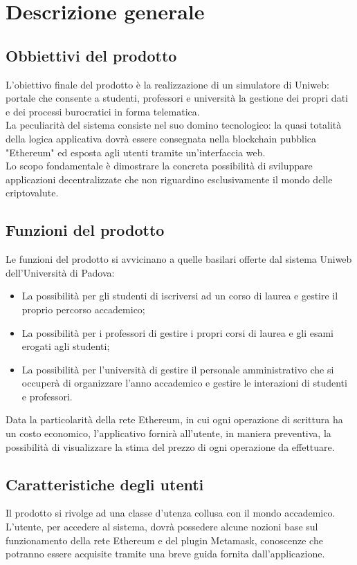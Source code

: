 \documentclass[AnalisiDeiRequisiti.tex]{subfiles}
\begin{document}
\chapter{Descrizione generale}
\section{Obbiettivi del prodotto}
L'obiettivo finale del prodotto è la realizzazione di un simulatore di Uniweb: portale che consente a studenti, professori e università la gestione dei propri dati e dei processi burocratici in forma telematica. \\
La peculiarità del sistema consiste nel suo domino tecnologico: la quasi totalità della logica applicativa dovrà essere consegnata nella blockchain pubblica "Ethereum" ed esposta agli utenti tramite un'interfaccia web. \\
Lo scopo fondamentale è dimostrare la concreta possibilità di sviluppare applicazioni decentralizzate che non riguardino esclusivamente il mondo delle criptovalute.

\section{Funzioni del prodotto}
Le funzioni del prodotto si avvicinano a quelle basilari offerte dal sistema Uniweb dell'Università di Padova:
\begin{itemize}
	\item La possibilità per gli studenti di iscriversi ad un corso di laurea e gestire il proprio percorso accademico;
	\item La possibilità per i professori di gestire i propri corsi di laurea e gli esami erogati agli studenti;
	\item La possibilità per l'università di gestire il personale amministrativo che si occuperà di organizzare l'anno accademico e gestire le interazioni di studenti e professori.
\end{itemize}
Data la particolarità della rete Ethereum, in cui ogni operazione di scrittura ha un costo economico, l'applicativo fornirà all'utente, in maniera preventiva, la possibilità di visualizzare la stima del prezzo di ogni operazione da effettuare.


\section{Caratteristiche degli utenti}
Il prodotto si rivolge ad una classe d'utenza collusa con il mondo accademico.\\
L'utente, per accedere al sistema, dovrà possedere alcune nozioni base sul funzionamento della rete Ethereum e del plugin Metamask, conoscenze che potranno essere acquisite tramite una breve guida fornita dall'applicazione.
\end{document}
